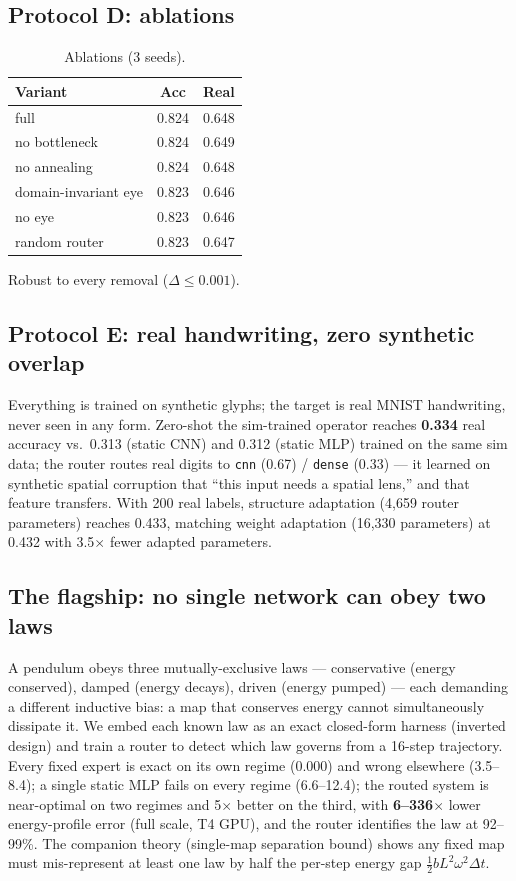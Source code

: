 \documentclass[conference,10pt]{IEEEtran}
\begin{document}
\subsection{Protocol D: ablations}\label{sec:D}
\begin{table}[h]
\centering
\caption{Ablations (3 seeds).}
\label{tab:d}
\begin{tabular}{lcc}
\toprule
Variant & Acc & Real\\
\midrule
full & 0.824 & 0.648\\
no bottleneck & 0.824 & 0.649\\
no annealing & 0.824 & 0.648\\
domain-invariant eye & 0.823 & 0.646\\
no eye & 0.823 & 0.646\\
random router & 0.823 & 0.647\\
\bottomrule
\end{tabular}
\end{table}
Robust to every removal ($\Delta \le 0.001$).

\subsection{Protocol E: real handwriting, zero synthetic overlap}\label{sec:E}
Everything is trained on synthetic glyphs; the target is real MNIST handwriting, never seen in any form. Zero-shot the sim-trained operator reaches \textbf{0.334} real accuracy vs.~0.313 (static CNN) and 0.312 (static MLP) trained on the same sim data; the router routes real digits to \texttt{cnn} (0.67) / \texttt{dense} (0.33) --- it learned on synthetic spatial corruption that ``this input needs a spatial lens,'' and that feature transfers. With 200 real labels, structure adaptation (4{,}659 router parameters) reaches 0.433, matching weight adaptation (16{,}330 parameters) at 0.432 with 3.5$\times$ fewer adapted parameters.

\subsection{The flagship: no single network can obey two laws}\label{sec:flagship}
A pendulum obeys three mutually-exclusive laws --- conservative (energy conserved), damped (energy decays), driven (energy pumped) --- each demanding a different inductive bias: a map that conserves energy cannot simultaneously dissipate it. We embed each known law as an exact closed-form harness (inverted design) and train a router to detect which law governs from a 16-step trajectory. Every fixed expert is exact on its own regime (0.000) and wrong elsewhere (3.5--8.4); a single static MLP fails on every regime (6.6--12.4); the routed system is near-optimal on two regimes and 5$\times$ better on the third, with \textbf{6--336$\times$} lower energy-profile error (full scale, T4 GPU), and the router identifies the law at 92--99\%. The companion theory (single-map separation bound) shows any fixed map must mis-represent at least one law by half the per-step energy gap $\tfrac12 bL^2\omega^2\Delta t$.
\end{document}
